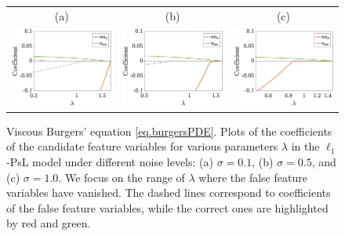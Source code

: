 \documentclass[a4paper,11pt]{article}
\theoremstyle{definition}
\begin{document}
\begin{figure}
\centering
\begin{tabular}{ccc}
(a)&(b)&(c)\\
\includegraphics[width=2in]{Figures/visburgers_0_1.eps}&
\includegraphics[width=2in]{Figures/visburgers_0_5.eps}&
\includegraphics[width=2in]{Figures/visburgers_1.eps}
\end{tabular}	
\caption{Viscous Burgers' equation \eqref{eq.burgersPDE}.  Plots of the coefficients of the candidate feature variables for various parameters $\lambda$ in the $\ell_1$-PsL model under different noise levels: (a) $\sigma=0.1$, (b) $\sigma=0.5$, and (c) $\sigma=1.0$.  We focus on the range of $\lambda$ where the false feature variables have vanished. The dashed lines correspond to coefficients of the false feature variables, while the correct ones are highlighted by red and green.}\label{expr.visburgers}
\end{figure}
\end{document}
